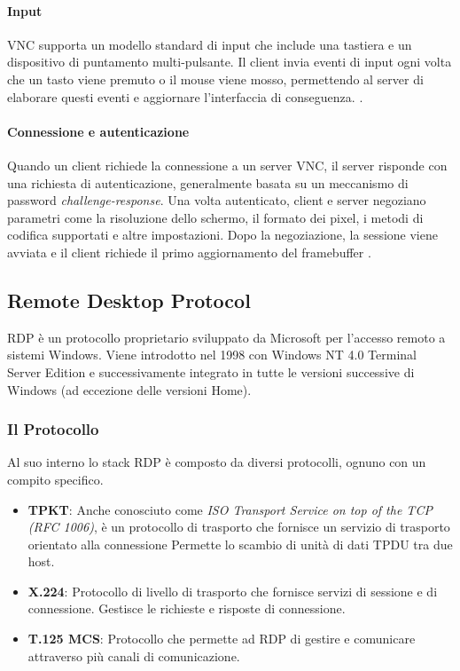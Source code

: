 \documentclass[12pt,a4paper,openright,twoside]{book}
\begin{document}
\paragraph{Input}

\ac{VNC} supporta un modello standard di input che include una tastiera e un dispositivo di puntamento multi-pulsante.
Il client invia eventi di input ogni volta che un tasto viene premuto o il mouse viene mosso, permettendo al server di elaborare questi eventi e aggiornare l'interfaccia di conseguenza. \cite{richardson1998vnc}.

\paragraph{Connessione e autenticazione}

Quando un client richiede la connessione a un server \ac{VNC},
il server risponde con una richiesta di autenticazione,
generalmente basata su un meccanismo di password \textit{challenge-response}.
%
Una volta autenticato, client e server negoziano parametri come la risoluzione dello schermo,
il formato dei pixel, i metodi di codifica supportati e altre impostazioni.
%
Dopo la negoziazione, la sessione viene avviata e il client richiede il primo aggiornamento del framebuffer \cite{richardson1998vnc}.

\subsection{Remote Desktop Protocol}

\ac{RDP} è un protocollo proprietario sviluppato da Microsoft per l'accesso remoto a sistemi Windows.
Viene introdotto nel 1998 con Windows NT 4.0 Terminal Server Edition e successivamente integrato in tutte le versioni successive di Windows (ad eccezione delle versioni Home).

\subsubsection{Il Protocollo}
Al suo interno lo stack \ac{RDP} è composto da diversi protocolli, ognuno con un compito specifico.
\begin{itemize}
    \item \textbf{TPKT}: Anche conosciuto come \emph{ISO Transport Service on top of the TCP (RFC 1006)}, è un protocollo di trasporto che fornisce un servizio di trasporto orientato alla connessione
     Permette lo scambio di unità di dati \ac{TPDU} tra due host.
    \item \textbf{X.224}: Protocollo di livello di trasporto che fornisce servizi di sessione e di connessione. Gestisce le richieste e risposte di connessione.
    \item \textbf{T.125 MCS}: Protocollo che permette ad \ac{RDP} di gestire e comunicare attraverso più canali di comunicazione.
\end{itemize}
\end{document}
